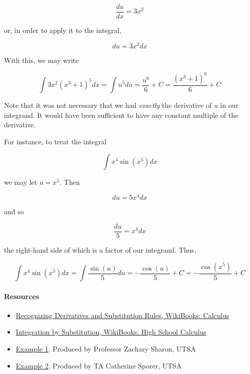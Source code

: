 $$\frac{du}{dx}=3x^2$$

or, in order to apply it to the integral,

$$du=3x^2dx$$

With this, we may write

$$\int 3x^2(x^3+1)^5dx=\int u^5du=\frac{u^6}{6}+C=\frac{(x^3+1)^6}{6}+C$$

Note that it was not necessary that we had \textit{exactly} the derivative of $u$ in our integrand. It would have been sufficient to have any constant multiple of the derivative.

For instance, to treat the integral

$$\int x^4\sin(x^5)dx$$

we may let $u=x^5$. Then

$$du=5x^4dx$$

and so

$$\frac{du}{5}=x^4dx$$

the right-hand side of which is a factor of our integrand. Thus,

$$\int x^4\sin(x^5)dx=\int\frac{\sin(u)}{5}du=-\frac{\cos(u)}{5}+C=-\frac{\cos(x^5)}{5}+C$$

\paragraph{Resources}

\begin{itemize}
    \item \href{https://en.wikibooks.org/wiki/Calculus/Integration_techniques/Recognizing_Derivatives_and_the_Substitution_Rule}{Recognizing Derivatives and Substitution Rules, WikiBooks: Calculus}
    \item \href{https://en.wikibooks.org/wiki/High_School_Calculus/Integration_by_Substitution}{Integration by Substitution, WikiBooks: High School Calculus}
    \item \href{https://www.youtube.com/watch?v=uoCW8S-I9Es}{Example 1}. Produced by Professor Zachary Sharon, UTSA
    \item \href{https://www.youtube.com/watch?v=zqMxMtjbaBE}{Example 2}. Produced by TA Catherine Sporer, UTSA
\end{itemize}

